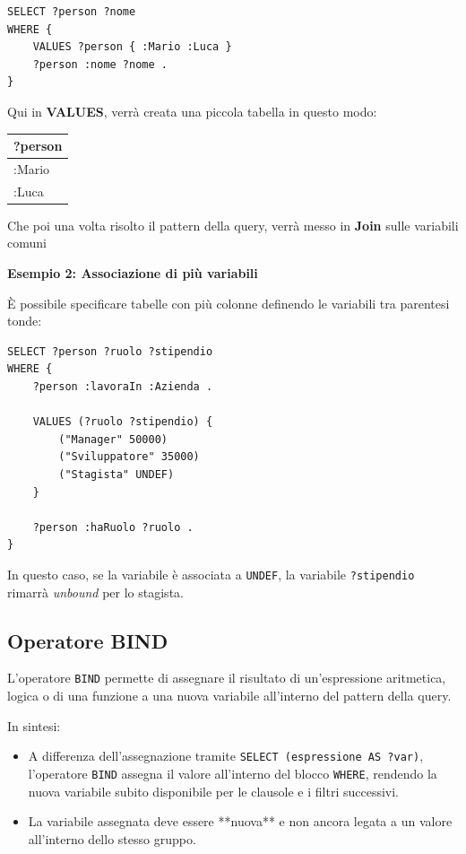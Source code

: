 \begin{verbatim}
SELECT ?person ?nome
WHERE {
    VALUES ?person { :Mario :Luca }
    ?person :nome ?nome .
}
\end{verbatim}

Qui in \textbf{VALUES}, verrà creata una piccola tabella in questo modo:
\begin{table}[h!]
\centering
\begin{tabular}{|l|}
\hline
\textbf{?person} \\ \hline
:Mario  \\ \hline
:Luca \\ \hline
\end{tabular}
\end{table} 

Che poi una volta risolto il pattern della query, verrà messo in \textbf{Join} sulle variabili comuni



\textbf{Esempio 2: Associazione di più variabili}

È possibile specificare tabelle con più colonne definendo le variabili tra parentesi tonde:

\begin{verbatim}
SELECT ?person ?ruolo ?stipendio
WHERE {
    ?person :lavoraIn :Azienda .
    
    VALUES (?ruolo ?stipendio) {
        ("Manager" 50000)
        ("Sviluppatore" 35000)
        ("Stagista" UNDEF)
    }
    
    ?person :haRuolo ?ruolo .
}
\end{verbatim}

In questo caso, se la variabile è associata a \texttt{UNDEF}, la variabile \texttt{?stipendio} rimarrà \textit{unbound} per lo stagista.


\subsection{Operatore BIND}


L'operatore \texttt{BIND} permette di assegnare il risultato di un'espressione aritmetica, logica o di una funzione a una nuova variabile all'interno del pattern della query.

In sintesi:
\begin{itemize}
    \item A differenza dell'assegnazione tramite \texttt{SELECT (espressione AS ?var)}, l'operatore \texttt{BIND} assegna il valore all'interno del blocco \texttt{WHERE}, rendendo la nuova variabile subito disponibile per le clausole e i filtri successivi.
    \item La variabile assegnata deve essere **nuova** e non ancora legata a un valore all'interno dello stesso gruppo.
\end{itemize}

